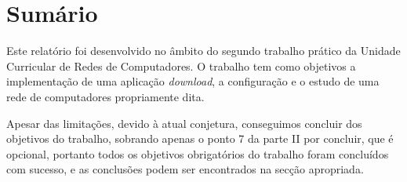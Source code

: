 \section*{Sumário}

Este relatório foi desenvolvido no âmbito do segundo trabalho prático da Unidade Curricular de Redes de Computadores. O trabalho tem como objetivos a implementação de uma aplicação \emph{download}, a configuração e o estudo de uma rede de computadores propriamente dita.

\noindent Apesar das limitações, devido à atual conjetura, conseguimos concluir dos objetivos do trabalho, sobrando apenas o ponto 7 da parte II por concluir, que é opcional, portanto todos os objetivos obrigatórios do trabalho foram concluídos com sucesso, e as conclusões podem ser encontrados na secção apropriada.